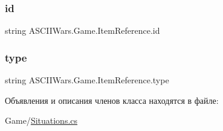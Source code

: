 \hypertarget{class_a_s_c_i_i_wars_1_1_game_1_1_item_reference_aefee1e2d5dac90be31ad4a9a3ee6fba2}{}\label{class_a_s_c_i_i_wars_1_1_game_1_1_item_reference_aefee1e2d5dac90be31ad4a9a3ee6fba2} 
\subsubsection{\texorpdfstring{id}{id}}
{\footnotesize\ttfamily string A\+S\+C\+I\+I\+Wars.\+Game.\+Item\+Reference.\+id}

\hypertarget{class_a_s_c_i_i_wars_1_1_game_1_1_item_reference_a7aeb379f2178fed498bd782a01888de3}{}\label{class_a_s_c_i_i_wars_1_1_game_1_1_item_reference_a7aeb379f2178fed498bd782a01888de3} 
\subsubsection{\texorpdfstring{type}{type}}
{\footnotesize\ttfamily string A\+S\+C\+I\+I\+Wars.\+Game.\+Item\+Reference.\+type}



Объявления и описания членов класса находятся в файле\+:\begin{DoxyCompactItemize}
\item 
Game/\hyperlink{_situations_8cs}{Situations.\+cs}\end{DoxyCompactItemize}
